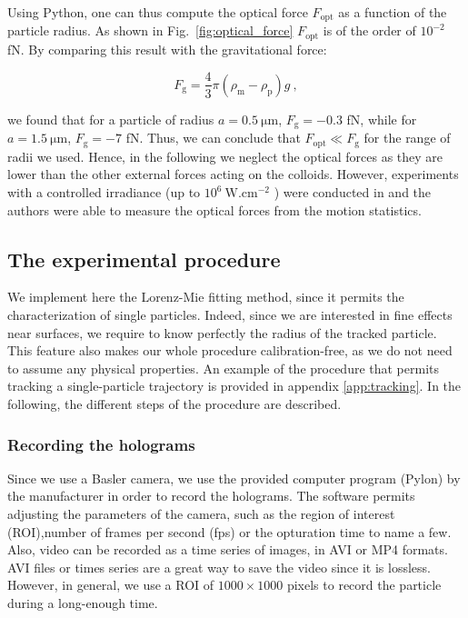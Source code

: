 Using Python, one can thus compute the optical force $F_\mathrm{opt}$ as a function of the particle radius. As shown in Fig.~\ref{fig:optical_force}  $F_\mathrm{opt}$ is of the order of $10^{-2}$ fN. By comparing this result with the gravitational force:

\begin{equation}
	F_\mathrm{g} =  \frac{4}{3} \pi (\rho_\mathrm{m} - \rho_\mathrm{p}) g ~,
\end{equation}

we found that for a particle of radius $a = 0.5 ~\mathrm{\mu m}$, $F_\mathrm{g} = -0.3 $ fN, while for $a = 1.5 ~\mathrm{\mu m}$, $F_\mathrm{g} = -7 $ fN. Thus, we can conclude that $F_\mathrm{opt} \ll F_\mathrm{g}$ for the range of radii we used. Hence, in the following we neglect the optical forces as they are lower than the other external forces acting on the colloids. However,  experiments with a controlled irradiance (up to $10^6 ~\mathrm{W.cm^{-2}}$ ) were conducted in \cite{prieve_measurement_1999} and the authors were able to measure the optical forces from the motion statistics.






\subsection{The experimental procedure}
We implement here the Lorenz-Mie fitting method, since it permits the characterization of single particles. Indeed, since we are interested in fine effects near surfaces, we require to know perfectly the radius of the tracked particle. This feature also makes our whole procedure calibration-free, as we do not need to assume any physical properties. An example of the procedure that permits tracking a single-particle trajectory is provided in appendix \ref{app:tracking}. In the following, the different steps of the procedure are described.

\subsubsection{Recording the holograms}
Since we use a Basler camera, we use the provided computer program (Pylon) by the manufacturer in order to record the holograms. The software permits adjusting the parameters of the camera, such as the region of interest (\gls{ROI}),number of frames per second (\gls{fps}) or the opturation time to name a few. Also, video can be recorded as a time series of images, in AVI or MP4 formats. AVI files or times series are a great way to save the video since it is lossless. However, in general, we use a \gls{ROI} of $1000 \times 1000$ pixels to record the particle during a long-enough time. 


